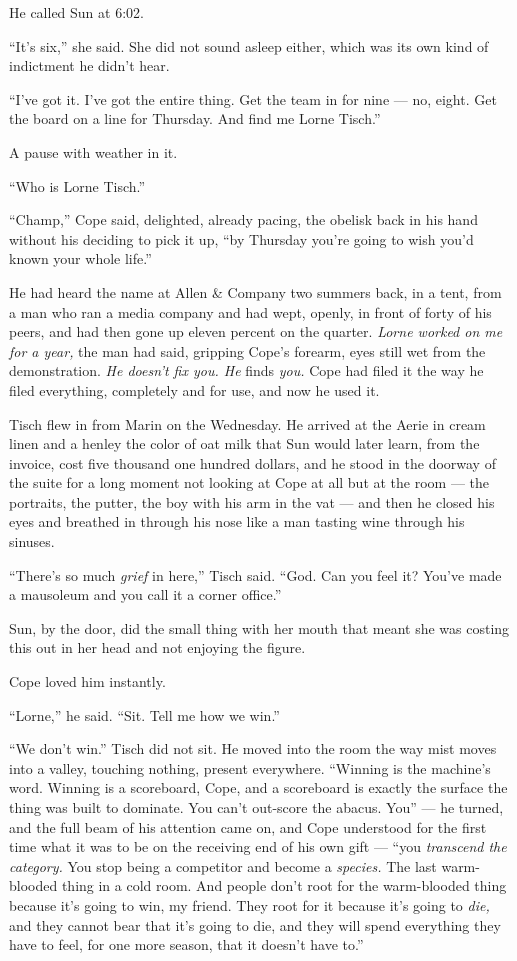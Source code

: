 \documentclass[11pt,openany]{book}
\newcommand{\scenebreak}{\par\vspace{0.5\baselineskip}\begin{center}\textasteriskcentered\quad\textasteriskcentered\quad\textasteriskcentered\end{center}\vspace{0.5\baselineskip}\par}
\begin{document}
He called Sun at 6:02.

``It's six,'' she said. She did not sound asleep either, which was its own kind of indictment he didn't hear.

``I've got it. I've got the entire thing. Get the team in for nine --- no, eight. Get the board on a line for Thursday. And find me Lorne Tisch.''

A pause with weather in it.

``Who is Lorne Tisch.''

``Champ,'' Cope said, delighted, already pacing, the obelisk back in his hand without his deciding to pick it up, ``by Thursday you're going to wish you'd known your whole life.''


\scenebreak


He had heard the name at Allen \& Company two summers back, in a tent, from a man who ran a media company and had wept, openly, in front of forty of his peers, and had then gone up eleven percent on the quarter. \textit{Lorne worked on me for a year,} the man had said, gripping Cope's forearm, eyes still wet from the demonstration. \textit{He doesn't fix you. He} finds \textit{you.} Cope had filed it the way he filed everything, completely and for use, and now he used it.

Tisch flew in from Marin on the Wednesday. He arrived at the Aerie in cream linen and a henley the color of oat milk that Sun would later learn, from the invoice, cost five thousand one hundred dollars, and he stood in the doorway of the suite for a long moment not looking at Cope at all but at the room --- the portraits, the putter, the boy with his arm in the vat --- and then he closed his eyes and breathed in through his nose like a man tasting wine through his sinuses.

``There's so much \textit{grief} in here,'' Tisch said. ``God. Can you feel it? You've made a mausoleum and you call it a corner office.''

Sun, by the door, did the small thing with her mouth that meant she was costing this out in her head and not enjoying the figure.

Cope loved him instantly.

``Lorne,'' he said. ``Sit. Tell me how we win.''

``We don't win.'' Tisch did not sit. He moved into the room the way mist moves into a valley, touching nothing, present everywhere. ``Winning is the machine's word. Winning is a scoreboard, Cope, and a scoreboard is exactly the surface the thing was built to dominate. You can't out-score the abacus. You'' --- he turned, and the full beam of his attention came on, and Cope understood for the first time what it was to be on the receiving end of his own gift --- ``you \textit{transcend the category.} You stop being a competitor and become a \textit{species.} The last warm-blooded thing in a cold room. And people don't root for the warm-blooded thing because it's going to win, my friend. They root for it because it's going to \textit{die,} and they cannot bear that it's going to die, and they will spend everything they have to feel, for one more season, that it doesn't have to.''
\end{document}

